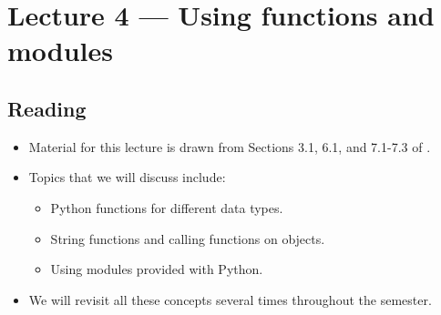 \documentclass[letterpaper,10pt,english]{sphinxmanual}
\begin{document}
\begin{enumerate}
\end{enumerate}
\begin{quote}

\begin{sphinxVerbatim}[commandchars=\\\{\}]
 

\end{sphinxVerbatim}
\end{quote}


\chapter{Lecture 4 — Using functions and modules}
\label{\detokenize{lecture_notes/lec04_modules_functions1:lecture-4-using-functions-and-modules}}\label{\detokenize{lecture_notes/lec04_modules_functions1::doc}}

\section{Reading}
\label{\detokenize{lecture_notes/lec04_modules_functions1:reading}}\begin{itemize}
\item {} 
Material for this lecture is drawn from Sections 3.1, 6.1, and
7.1-7.3 of .

\item {} 
Topics that we will discuss include:
\begin{itemize}
\item {} 
Python functions for different data types.

\item {} 
String functions and calling functions on objects.

\item {} 
Using modules provided with Python.

\end{itemize}

\item {} 
We will revisit all these concepts several times throughout the semester.

\end{itemize}
\end{document}
